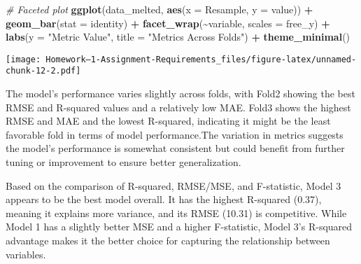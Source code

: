 \documentclass[
]{article}
\newenvironment{Shaded}{\begin{snugshade}}{\end{snugshade}}
\newcommand{\AttributeTok}[1]{\textcolor[rgb]{0.13,0.29,0.53}{#1}}
\newcommand{\CommentTok}[1]{\textcolor[rgb]{0.56,0.35,0.01}{\textit{#1}}}
\newcommand{\FunctionTok}[1]{\textcolor[rgb]{0.13,0.29,0.53}{\textbf{#1}}}
\newcommand{\NormalTok}[1]{#1}
\newcommand{\SpecialCharTok}[1]{\textcolor[rgb]{0.81,0.36,0.00}{\textbf{#1}}}
\newcommand{\StringTok}[1]{\textcolor[rgb]{0.31,0.60,0.02}{#1}}
\begin{document}
\begin{Shaded}
\begin{Highlighting}[]
\CommentTok{\# Faceted plot}
\FunctionTok{ggplot}\NormalTok{(data\_melted, }\FunctionTok{aes}\NormalTok{(}\AttributeTok{x =}\NormalTok{ Resample, }\AttributeTok{y =}\NormalTok{ value)) }\SpecialCharTok{+}
  \FunctionTok{geom\_bar}\NormalTok{(}\AttributeTok{stat =} \StringTok{\textquotesingle{}identity\textquotesingle{}}\NormalTok{) }\SpecialCharTok{+}
  \FunctionTok{facet\_wrap}\NormalTok{(}\SpecialCharTok{\textasciitilde{}}\NormalTok{variable, }\AttributeTok{scales =} \StringTok{\textquotesingle{}free\_y\textquotesingle{}}\NormalTok{) }\SpecialCharTok{+}
  \FunctionTok{labs}\NormalTok{(}\AttributeTok{y =} \StringTok{"Metric Value"}\NormalTok{, }\AttributeTok{title =} \StringTok{"Metrics Across Folds"}\NormalTok{) }\SpecialCharTok{+}
  \FunctionTok{theme\_minimal}\NormalTok{()}
\end{Highlighting}
\end{Shaded}

\texttt{[image: Homework--1-Assignment-Requirements\_files/figure-latex/unnamed-chunk-12-2.pdf]}

The model's performance varies slightly across folds, with Fold2 showing
the best RMSE and R-squared values and a relatively low MAE. Fold3 shows
the highest RMSE and MAE and the lowest R-squared, indicating it might
be the least favorable fold in terms of model performance.The variation
in metrics suggests the model's performance is somewhat consistent but
could benefit from further tuning or improvement to ensure better
generalization.

Based on the comparison of R-squared, RMSE/MSE, and F-statistic, Model 3
appears to be the best model overall. It has the highest R-squared
(0.37), meaning it explains more variance, and its RMSE (10.31) is
competitive. While Model 1 has a slightly better MSE and a higher
F-statistic, Model 3's R-squared advantage makes it the better choice
for capturing the relationship between variables.
\end{document}
